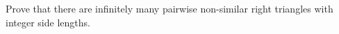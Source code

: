 Prove that there are infinitely many pairwise non-similar right triangles with integer side lengths.
